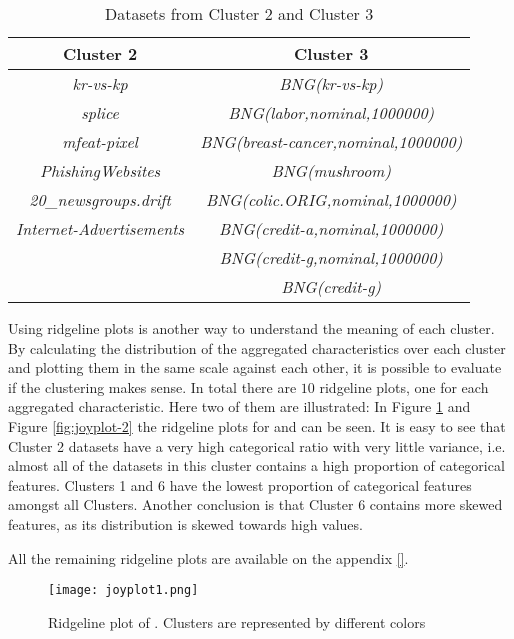 \begin{table}[h!] 
    \centering
    \begin{tabular}{||c c||} 
     \hline
     Cluster 2 & Cluster 3 \\ [0.5ex] 
     \hline\hline
     \textit{kr-vs-kp} & \textit{BNG(kr-vs-kp)} \\
     \textit{splice} & \textit{BNG(labor,nominal,1000000)} \\
     \textit{mfeat-pixel} & \textit{BNG(breast-cancer,nominal,1000000)} \\
     \textit{PhishingWebsites} & \textit{BNG(mushroom)} \\
     \textit{20\_newsgroups.drift} & \textit{BNG(colic.ORIG,nominal,1000000)} \\
     \textit{Internet-Advertisements} & \textit{BNG(credit-a,nominal,1000000)} \\
     & \textit{BNG(credit-g,nominal,1000000)} \\
     & \textit{BNG(credit-g)} \\[1ex] 
     \hline
    \end{tabular}
    \caption{Datasets from Cluster 2 and Cluster 3}
    \label{table:1}
\end{table}

Using ridgeline plots is another way to understand the meaning of each cluster. By calculating the distribution of the aggregated characteristics over each cluster and plotting them in the same scale against each other, it is possible to evaluate if the clustering makes sense. In total there are $10$ ridgeline plots, one for each aggregated characteristic. Here two of them are illustrated: In Figure \ref{fig:joyplot-1} and Figure \ref{fig:joyplot-2} the ridgeline plots for  and  can be seen. It is easy to see that Cluster 2 datasets have a very high categorical ratio with very little variance, i.e. almost all of the datasets in this cluster contains a high proportion of categorical features. Clusters 1 and 6 have the lowest proportion of categorical features amongst all Clusters. Another conclusion is that Cluster 6 contains more skewed features, as its distribution is skewed towards high  values.

All the remaining ridgeline plots are available on the appendix \ref{}.

\begin{figure}[!h]
    \centering
    \texttt{[image: joyplot1.png]}
    \caption{Ridgeline plot of . Clusters are represented by different colors}
    \label{fig:joyplot-1}
\end{figure}

